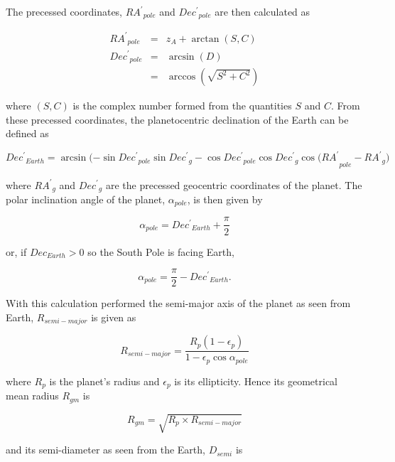 \documentclass[11pt,twoside]{starlink}
\begin{document}
The precessed coordinates, ${RA^\prime}_{pole}$ and ${Dec^\prime}_{pole}$ are then calculated as

\begin{eqnarray*}
{RA^\prime}_{pole} & = & z_A + \arctan(S,C)\\
{Dec^\prime}_{pole} & = & \arcsin (D)\\
& = & \arccos (\sqrt{ S^2 + C^2})
\end{eqnarray*}

where $(S,C)$ is the complex number formed from the quantities $S$ and $C$.  From these precessed coordinates, the planetocentric declination of the Earth can be defined as

\begin{displaymath}
{Dec^\prime}_{Earth} = \arcsin {(-\sin {Dec^\prime}_{pole} \sin {Dec^\prime}_g - \cos {Dec^\prime}_{pole} \cos {Dec^\prime}_g \cos (RA^\prime}_{pole} - {RA^\prime}_g)
\end{displaymath}

where ${RA^\prime}_g$ and ${Dec^\prime}_g$ are the precessed geocentric coordinates of the planet.  The polar inclination angle of the planet, $\alpha_{pole}$,  is then given by

\begin{displaymath}
\alpha_{pole} = {Dec^\prime}_{Earth} + \frac{\pi}{2}
\end{displaymath}

or, if $Dec_{Earth} > 0$ so the South Pole is facing Earth,

\begin{displaymath}
\alpha_{pole} =  \frac{\pi}{2} - {Dec^\prime}_{Earth}.
\end{displaymath}

With this calculation performed the semi-major axis of the planet as seen from Earth, $R_{semi-major}$ is given as

\begin{displaymath}
R_{semi-major} = \frac{R_{p} (1 - \epsilon_p)}{1 - \epsilon_p \cos \alpha_{pole}}
\end {displaymath}

where $R_p$ is the planet's radius and $\epsilon_p$ is its ellipticity.  Hence its geometrical mean radius $R_{gm}$ is

\begin{displaymath}
R_{gm} = \sqrt{R_p \times R_{semi-major}}
\end{displaymath}

and its semi-diameter as seen from the Earth, $D_{semi}$ is
\end{document}
